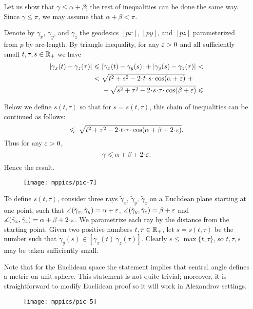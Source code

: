 

Let us show that $\gamma\le\alpha+\beta$; the rest of inequalities can be done the same way.
Since $\gamma\le\pi$, we may assume that $\alpha+\beta< \pi$.

Denote by $\gamma_x$, $\gamma_y$, and $\gamma_z$ the geodesics $[px]$, $[py]$, and $[pz]$ parameterized from $p$ by arc-length.
By triangle inequality,
for any $\varepsilon>0$ and all sufficiently small $t,\tau,s\in\mathbb{R}_+$ we have
\begin{align*}
\dist{\gamma_x(t)}{\gamma_z(\tau)}{}
\le 
\ &\dist{\gamma_x(t)}{\gamma_y(s)}{}+\dist{\gamma_y(s)}{\gamma_z(\tau)}{}<\\
<
\ &\sqrt{t^2+s^2-2\cdot t\cdot  s\cdot \cos(\alpha+\eps)}\ +
\\
&+\sqrt{s^2+\tau^2-2\cdot s\cdot \tau\cdot \cos(\beta+\eps)}\le
\end{align*}

Below we define 
$s(t,\tau)$ so that for 
$s=s(t,\tau)$, this chain of inequalities can be continued as follows:
\[\le
\ \sqrt{t^2+\tau^2-2\cdot t\cdot \tau\cdot \cos(\alpha+\beta+2\cdot \eps)}.
\]
Thus for any $\varepsilon>0$, 
\[\gamma\le \alpha+\beta+2\cdot \eps.\]
Hence the result.

\begin{wrapfigure}{r}{30 mm}
\vskip-8mm
\centering
\texttt{[image: mppics/pic-7]}
\end{wrapfigure}

To define $s(t,\tau)$, consider three rays $\tilde \gamma_x$, $\tilde \gamma_y$, $\tilde \gamma_z$ on a Euclidean plane starting at one point, such that $\measuredangle(\tilde \gamma_x,\tilde \gamma_y)=\alpha+\varepsilon$,
$\measuredangle(\tilde \gamma_y,\tilde \gamma_z)=\beta+\varepsilon$ and $\mangle(\tilde \gamma_x,\tilde \gamma_z)=\alpha+\beta+2\cdot \eps$.
We parametrize each ray by the distance from the starting point.
Given two positive numbers $t,\tau\in\mathbb{R}_+$, let $s=s(t,\tau)$ be 
the number such that 
$\tilde \gamma_y(s)\in[\tilde \gamma_x(t)\ \tilde \gamma_z(\tau)]$. 
Clearly $s\le\max\{t,\tau\}$, so $t,\tau,s$ may be taken sufficiently small.

Note that for the Euclidean space the statement implies that central angle defines a metric on unit sphere.
This statement is not quite trivial; moreover, it is straightforward to modify Euclidean proof so it will work in Alexandrov settings. 

\begin{wrapfigure}{r}{30 mm}
\vskip-2mm
\centering
\texttt{[image: mppics/pic-5]}
\end{wrapfigure}

